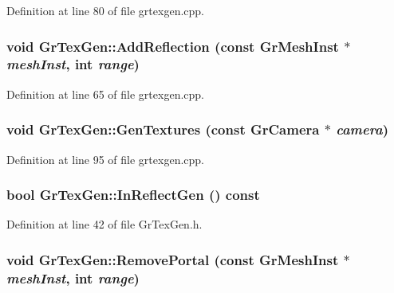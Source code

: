 Definition at line 80 of file grtexgen.cpp.\hypertarget{class_gr_tex_gen_64dbd7edc5613d3ca054df90a3c5f849}{
\subsubsection[{AddReflection}]{\setlength{\rightskip}{0pt plus 5cm}void GrTexGen::AddReflection (const {\bf GrMeshInst} $\ast$ {\em meshInst}, \/  int {\em range})}}
\label{class_gr_tex_gen_64dbd7edc5613d3ca054df90a3c5f849}




Definition at line 65 of file grtexgen.cpp.\hypertarget{class_gr_tex_gen_2b7147f4005460de60c3db9ed919c998}{
\subsubsection[{GenTextures}]{\setlength{\rightskip}{0pt plus 5cm}void GrTexGen::GenTextures (const {\bf GrCamera} $\ast$ {\em camera})}}
\label{class_gr_tex_gen_2b7147f4005460de60c3db9ed919c998}




Definition at line 95 of file grtexgen.cpp.\hypertarget{class_gr_tex_gen_717606667a09d57960162abcdccd87dc}{
\subsubsection[{InReflectGen}]{\setlength{\rightskip}{0pt plus 5cm}bool GrTexGen::InReflectGen () const}}
\label{class_gr_tex_gen_717606667a09d57960162abcdccd87dc}




Definition at line 42 of file GrTexGen.h.\hypertarget{class_gr_tex_gen_a8981d6674916e685436eb441553ac45}{
\subsubsection[{RemovePortal}]{\setlength{\rightskip}{0pt plus 5cm}void GrTexGen::RemovePortal (const {\bf GrMeshInst} $\ast$ {\em meshInst}, \/  int {\em range})}}
\label{class_gr_tex_gen_a8981d6674916e685436eb441553ac45}




